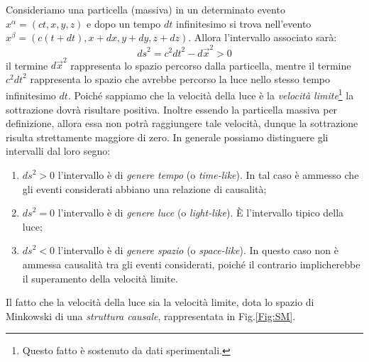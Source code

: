 Consideriamo una particella (massiva) in un determinato evento $x^{\alpha}=(ct,x,y,z)$ e dopo un tempo $dt$ infinitesimo si trova nell'evento $x^{\beta}=(c(t+dt),x+dx,y+dy,z+dz)$. Allora l'intervallo associato sarà:
\begin{equation*}
    {ds}^2=c^2{dt}^2-{d\vec{x}}^2>0
\end{equation*}
il termine ${d\vec{x}}^2$ rappresenta lo spazio percorso dalla particella, mentre il termine $c^2{dt}^2$ rappresenta lo spazio che avrebbe percorso la luce nello stesso tempo infinitesimo $dt$. Poiché sappiamo che la velocità della luce è la \textit{velocità limite}\footnote{Questo fatto è sostenuto da dati sperimentali.} la sottrazione dovrà risultare positiva. Inoltre essendo la particella massiva per definizione, allora essa non potrà raggiungere tale velocità, dunque la sottrazione risulta strettamente maggiore di zero.
In generale possiamo distinguere gli intervalli dal loro segno:
\begin{enumerate}
    \item ${ds}^2>0$  l'intervallo è di \textit{genere tempo} (o \textit{time-like}). In tal caso è ammesso che gli eventi considerati abbiano una relazione di causalità;
    \item ${ds}^2=0$ l'intervallo è di \textit{genere luce} (o \textit{light-like}). \`E l'intervallo tipico della luce;
    \item ${ds}^2<0$ l'intervallo è di \textit{genere spazio} (o \textit{space-like}). In questo caso non è ammessa causalità tra gli eventi considerati, poiché il contrario implicherebbe il superamento della velocità limite.
\end{enumerate}
 Il fatto che la velocità della luce sia la velocità limite, dota lo spazio di Minkowski di una \textit{struttura causale}, rappresentata in Fig.\ref{Fig:SM}.
 
